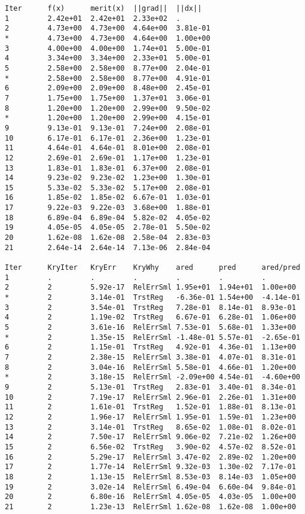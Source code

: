 \begin{lstlisting}[style=peoptOutput,caption={PEOpt generates this output when running the Rosenbrock example in Listing \ref{lst:Rosen}.  We explain this output in Chapter \ref{ch:Output}.},label=lst:RosenOut]
Iter      f(x)      merit(x)  ||grad||  ||dx||    
1         2.42e+01  2.42e+01  2.33e+02  .         
2         4.73e+00  4.73e+00  4.64e+00  3.81e-01  
*         4.73e+00  4.73e+00  4.64e+00  1.00e+00  
3         4.00e+00  4.00e+00  1.74e+01  5.00e-01  
4         3.34e+00  3.34e+00  2.33e+01  5.00e-01  
5         2.58e+00  2.58e+00  8.77e+00  2.04e-01  
*         2.58e+00  2.58e+00  8.77e+00  4.91e-01  
6         2.09e+00  2.09e+00  8.48e+00  2.45e-01  
7         1.75e+00  1.75e+00  1.37e+01  3.06e-01  
8         1.20e+00  1.20e+00  2.99e+00  9.50e-02  
*         1.20e+00  1.20e+00  2.99e+00  4.15e-01  
9         9.13e-01  9.13e-01  7.24e+00  2.08e-01  
10        6.17e-01  6.17e-01  2.36e+00  1.23e-01  
11        4.64e-01  4.64e-01  8.01e+00  2.08e-01  
12        2.69e-01  2.69e-01  1.17e+00  1.23e-01  
13        1.83e-01  1.83e-01  6.37e+00  2.08e-01  
14        9.23e-02  9.23e-02  1.23e+00  1.30e-01  
15        5.33e-02  5.33e-02  5.17e+00  2.08e-01  
16        1.85e-02  1.85e-02  6.67e-01  1.03e-01  
17        9.22e-03  9.22e-03  3.68e+00  1.88e-01  
18        6.89e-04  6.89e-04  5.82e-02  4.05e-02  
19        4.05e-05  4.05e-05  2.78e-01  5.50e-02  
20        1.62e-08  1.62e-08  2.58e-04  2.83e-03  
21        2.64e-14  2.64e-14  7.13e-06  2.84e-04 

Iter      KryIter   KryErr    KryWhy    ared      pred      ared/pred 
1         .         .         .         .         .         .         
2         2         5.92e-17  RelErrSml 1.95e+01  1.94e+01  1.00e+00  
*         2         3.14e-01  TrstReg   -6.36e-01 1.54e+00  -4.14e-01 
3         2         3.54e-01  TrstReg   7.28e-01  8.14e-01  8.93e-01  
4         2         1.19e-02  TrstReg   6.67e-01  6.28e-01  1.06e+00  
5         2         3.61e-16  RelErrSml 7.53e-01  5.68e-01  1.33e+00  
*         2         1.35e-15  RelErrSml -1.48e-01 5.57e-01  -2.65e-01 
6         2         1.15e-01  TrstReg   4.92e-01  4.36e-01  1.13e+00  
7         2         2.38e-15  RelErrSml 3.38e-01  4.07e-01  8.31e-01  
8         2         3.04e-16  RelErrSml 5.58e-01  4.66e-01  1.20e+00  
*         2         3.18e-15  RelErrSml -2.09e+00 4.54e-01  -4.60e+00 
9         2         5.13e-01  TrstReg   2.83e-01  3.40e-01  8.34e-01  
10        2         7.19e-17  RelErrSml 2.96e-01  2.26e-01  1.31e+00  
11        2         1.61e-01  TrstReg   1.52e-01  1.88e-01  8.13e-01  
12        2         1.96e-17  RelErrSml 1.95e-01  1.59e-01  1.23e+00  
13        2         3.14e-01  TrstReg   8.65e-02  1.08e-01  8.02e-01  
14        2         7.50e-17  RelErrSml 9.06e-02  7.21e-02  1.26e+00  
15        2         6.56e-02  TrstReg   3.90e-02  4.57e-02  8.52e-01  
16        2         5.29e-17  RelErrSml 3.47e-02  2.89e-02  1.20e+00  
17        2         1.77e-14  RelErrSml 9.32e-03  1.30e-02  7.17e-01  
18        2         1.13e-15  RelErrSml 8.53e-03  8.14e-03  1.05e+00  
19        2         3.02e-14  RelErrSml 6.49e-04  6.60e-04  9.84e-01  
20        2         6.80e-16  RelErrSml 4.05e-05  4.03e-05  1.00e+00  
21        2         1.23e-13  RelErrSml 1.62e-08  1.62e-08  1.00e+00
\end{lstlisting}
